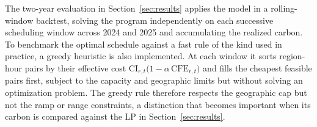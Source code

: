 The two-year evaluation in Section~\ref{sec:results} applies the model in a rolling-window backtest, solving the program independently on each successive scheduling window across 2024 and 2025 and accumulating the realized carbon. To benchmark the optimal schedule against a fast rule of the kind used in practice, a greedy heuristic is also implemented. At each window it sorts region-hour pairs by their effective cost $\text{CI}_{r,t}\bigl(1 - \alpha\,\text{CFE}_{r,t}\bigr)$ and fills the cheapest feasible pairs first, subject to the capacity and geographic limits but without solving an optimization problem. The greedy rule therefore respects the geographic cap but not the ramp or range constraints, a distinction that becomes important when its carbon is compared against the LP in Section~\ref{sec:results}.

